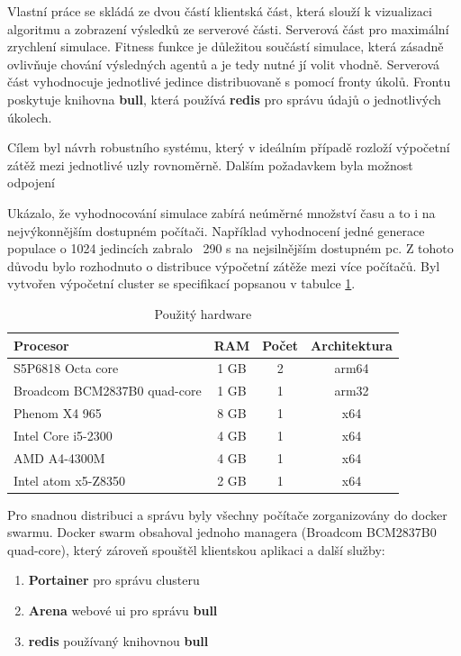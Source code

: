 Vlastní práce se skládá ze dvou částí klientská část, která slouží k vizualizaci algoritmu a zobrazení výsledků ze serverové části. Serverová část pro maximální zrychlení simulace. 
Fitness funkce je důležitou součástí simulace, která zásadně ovlivňuje chování výsledných agentů a je tedy nutné jí volit vhodně. 
Serverová část vyhodnocuje jednotlivé jedince distribuovaně s pomocí fronty úkolů. Frontu poskytuje knihovna \textbf{bull}, která používá \textbf{redis} pro správu údajů o jednotlivých úkolech.

Cílem byl návrh robustního systému, který v ideálním případě rozloží výpočetní zátěž mezi jednotlivé uzly rovnoměrně. Dalším požadavkem byla možnost odpojení 

Ukázalo, že vyhodnocování simulace zabírá neúměrné množství času a to i na nejvýkonnějším dostupném počítači. 
Například vyhodnocení jedné generace populace o 1024 jedincích zabralo ~290 s na nejsilnějším dostupném pc. Z tohoto důvodu bylo rozhodnuto o distribuce výpočetní zátěže mezi více počítačů. Byl vytvořen výpočetní cluster se specifikací popsanou v tabulce \ref{table:hw_table}.
\begin{table}[h!]
	\centering
	\begin{tabular}{|l|c|c|c|}
		\hline 
		Procesor & RAM & Počet & Architektura\\ 
		\hline 
		S5P6818 Octa core & 1 GB & 2 & arm64 \\ 
		\hline 
		Broadcom BCM2837B0 quad-core & 1 GB & 1 & arm32 \\ 
		\hline 
		Phenom X4 965 & 8 GB & 1 & x64 \\ 
		\hline
		Intel Core i5-2300 & 4 GB & 1 & x64 \\ 
		\hline
		AMD A4-4300M & 4 GB & 1 & x64 \\ 
		\hline 
		Intel atom x5-Z8350 & 2 GB & 1 & x64 \\ 
		\hline
	\end{tabular} 
	\caption{Použitý hardware}
	\label{table:hw_table}
\end{table}

Pro snadnou distribuci a správu byly všechny počítače zorganizovány do docker swarmu. Docker swarm obsahoval jednoho managera (Broadcom BCM2837B0 quad-core), který zároveň spouštěl klientskou aplikaci a další služby:

\begin{enumerate}
	\item \textbf{Portainer} pro správu clusteru
	\item \textbf{Arena} webové ui pro správu \textbf{bull}
	\item \textbf{redis} používaný knihovnou \textbf{bull}
\end{enumerate}


